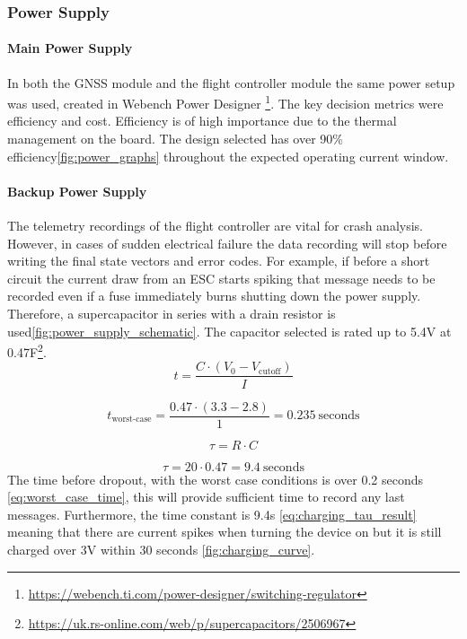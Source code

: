 \subsubsection{Power Supply}
\paragraph{Main Power Supply}
In both the GNSS module and the flight controller module the same power setup was used, created in Webench Power Designer \footnote{\url{https://webench.ti.com/power-designer/switching-regulator}}. The key decision metrics were efficiency and cost.  Efficiency is of high importance due to the thermal management on the board. The design selected has over 90\% efficiency\ref{fig:power_graphs} throughout the expected operating current window.

\paragraph{Backup Power Supply}
The telemetry recordings of the flight controller are vital for crash analysis. However, in cases of sudden electrical failure the data recording will stop before writing the final state vectors and error codes. For example, if before a short circuit the current draw from an \gls{ESC} starts spiking that message needs to be recorded even if a fuse immediately burns shutting down the power supply. Therefore, a supercapacitor in series with a drain resistor is used\ref{fig:power_supply_schematic}. The capacitor selected is rated up to 5.4V at 0.47F\footnote{\url{https://uk.rs-online.com/web/p/supercapacitors/2506967}}. 
\begin{equation}
t = \frac{C \cdot (V_0 - V_{\text{cutoff}})}{I}
\label{eq:discharge_time}
\end{equation}

\begin{equation}
t_{\text{worst-case}} = \frac{0.47 \cdot (3.3 - 2.8)}{1} = 0.235\ \text{seconds}
\label{eq:worst_case_time}
\end{equation}

\begin{equation}
\tau = R \cdot C
\label{eq:charging_time_constant}
\end{equation}

\begin{equation}
\tau = 20 \cdot 0.47 = 9.4\ \text{seconds}
\label{eq:charging_tau_result}
\end{equation}
The time before dropout, with the worst case conditions is over 0.2 seconds \ref{eq:worst_case_time}, this will provide sufficient time to record any last messages. Furthermore, the time constant is 9.4s \ref{eq:charging_tau_result} meaning that there are current spikes when turning the device on but it is still charged over 3V within 30 seconds \ref{fig:charging_curve}.

